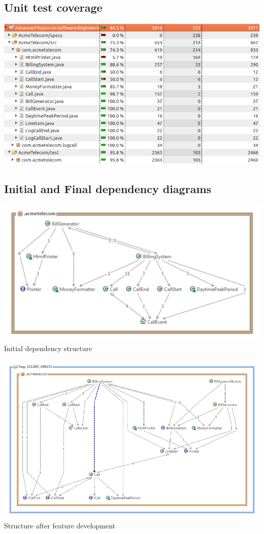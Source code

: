 \documentclass[pdftex,11pt,a4paper]{article}
\begin{document}
\subsection{Unit test coverage}
\begin{center}
	\includegraphics[scale=0.55]{images/emma_code_coverage_.png}
\end{center}

\subsection{Initial and Final dependency diagrams}

\begin{center}
	\includegraphics[scale=0.7]{images/Acme_Telecom_Structure.pdf}
Initial dependency structure
\end{center}

\begin{center}
	\includegraphics[scale=0.45]{images/AcmeTelecom_Software_Structure_After_Refactoring.png}\\
Structure after feature development
\end{center}
\end{document}
